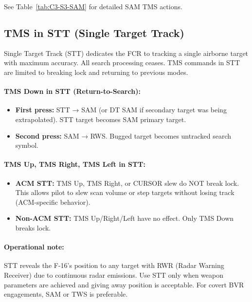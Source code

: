 \documentclass[11pt, a4paper, twoside]{report}
\begin{document}
See Table~\ref{tab:C3-S3-SAM} for detailed SAM TMS actions.

\subsection{TMS in STT (Single Target Track)}
\label{sec:C3-S3-S2}

Single Target Track (STT) dedicates the FCR to tracking a single airborne target with maximum accuracy. All search processing ceases. TMS commands in STT are limited to breaking lock and returning to previous modes.

\paragraph{TMS Down in STT (Return-to-Search):}
\begin{itemize}
    \item \textbf{First press:} STT → SAM (or DT SAM if secondary target was being extrapolated). STT target becomes SAM primary target.
    \item \textbf{Second press:} SAM → RWS. Bugged target becomes untracked search symbol.
\end{itemize}

\paragraph{TMS Up, TMS Right, TMS Left in STT:}
\begin{itemize}
    \item \textbf{ACM STT:} TMS Up, TMS Right, or CURSOR slew do NOT break lock. This allows pilot to slew scan volume or step targets without losing track (ACM-specific behavior).
    \item \textbf{Non-ACM STT:} TMS Up/Right/Left have no effect. Only TMS Down breaks lock.
\end{itemize}

\paragraph{Operational note:}
STT reveals the F-16's position to any target with RWR (Radar Warning Receiver) due to continuous radar emissions. Use STT only when weapon parameters are achieved and giving away position is acceptable. For covert BVR engagements, SAM or TWS is preferable.
\end{document}
